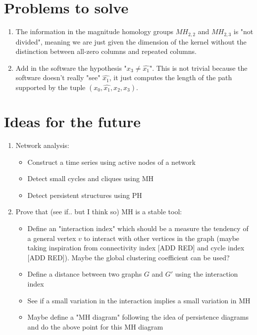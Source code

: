 \documentclass{article}
\begin{document}
	\section{Problems to solve}
	
	\begin{enumerate}
		\item The information in the magnitude homology groups $MH_{2,2}$ and $MH_{2,3}$ is "not divided", meaning we are just given the dimension of the kernel without the distinction between all-zero columns and repeated columns.
		\item Add in the software the hypothesis "$x_3 \neq \hat{x_1}$". This is not trivial because the software doesn't really "see" $\hat{x_1}$, it just computes the length of the path supported by the tuple $(x_0,\hat{x_1},x_2,x_3)$.
	\end{enumerate}

\section{Ideas for the future}

\begin{enumerate}
	\item Network analysis:
	\begin{itemize}
		\item Construct a time series using active nodes of a network
		\item Detect small cycles and cliques using MH
		\item Detect persistent structures using PH
	\end{itemize}

	\item Prove that (see if.. but I think so) MH is a stable tool:
	\begin{itemize}
		\item Define an "interaction index" which should be a measure the tendency of a general vertex $v$ to interact with other vertices in the graph (maybe taking inspiration from connectivity index [ADD RED] and cycle index [ADD RED]). Maybe the global clustering coefficient can be used?
		\item Define a distance between two graphs $G$ and $G'$ using the interaction index
		\item See if a small variation in the interaction implies a small variation in MH
		\item Maybe define a "MH diagram" following the idea of persistence diagrams and do the above point for this MH diagram  
	\end{itemize}
	
\end{enumerate}

	


\end{document}
